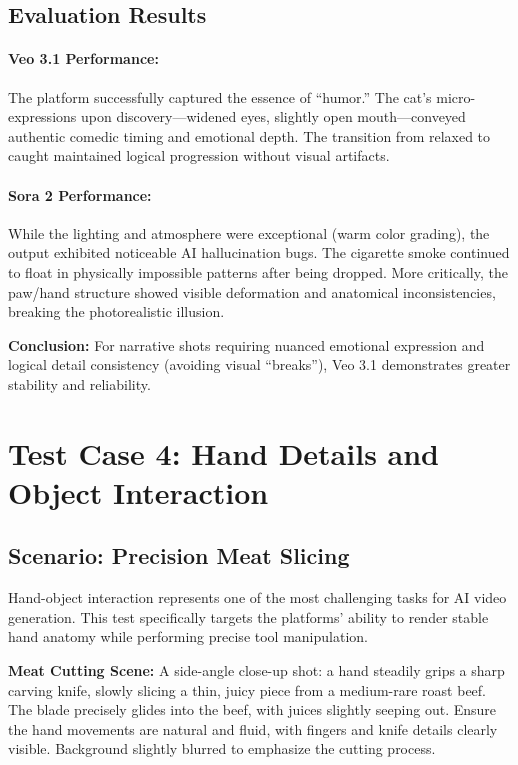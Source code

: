 \subsection{Evaluation Results}

\paragraph{Veo 3.1 Performance:}
The platform successfully captured the essence of ``humor.'' The cat's micro-expressions upon discovery---widened eyes, slightly open mouth---conveyed authentic comedic timing and emotional depth. The transition from relaxed to caught maintained logical progression without visual artifacts.

\paragraph{Sora 2 Performance:}
While the lighting and atmosphere were exceptional (warm color grading), the output exhibited noticeable AI hallucination bugs. The cigarette smoke continued to float in physically impossible patterns after being dropped. More critically, the paw/hand structure showed visible deformation and anatomical inconsistencies, breaking the photorealistic illusion.

\begin{resultbox}
\textbf{Conclusion:} For narrative shots requiring nuanced emotional expression and logical detail consistency (avoiding visual ``breaks''), Veo 3.1 demonstrates greater stability and reliability.
\end{resultbox}

\section{Test Case 4: Hand Details and Object Interaction}
\label{sec:test-case-4}

\subsection{Scenario: Precision Meat Slicing}

Hand-object interaction represents one of the most challenging tasks for AI video generation. This test specifically targets the platforms' ability to render stable hand anatomy while performing precise tool manipulation.

\begin{promptbox}
\small
\textbf{Meat Cutting Scene:} A side-angle close-up shot: a hand steadily grips a sharp carving knife, slowly slicing a thin, juicy piece from a medium-rare roast beef. The blade precisely glides into the beef, with juices slightly seeping out. Ensure the hand movements are natural and fluid, with fingers and knife details clearly visible. Background slightly blurred to emphasize the cutting process.
\end{promptbox}


